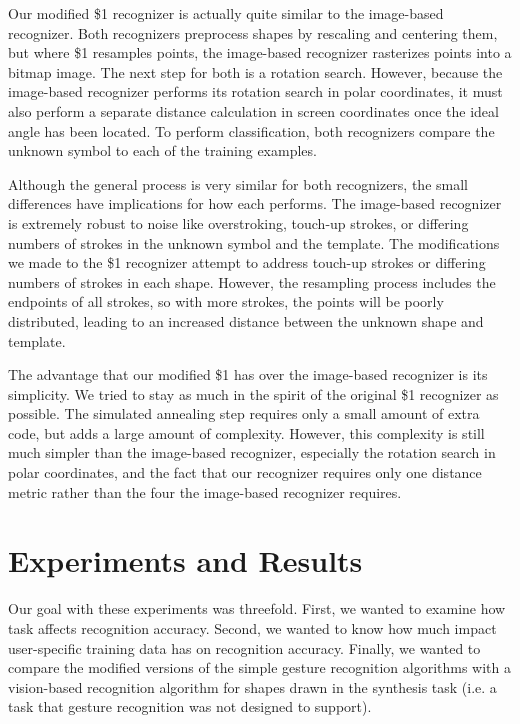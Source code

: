 \documentclass{egpubl}
\begin{document}
Our modified \$1 recognizer is actually quite similar to the image-based recognizer. Both recognizers preprocess shapes by rescaling and centering them, but where \$1 resamples points, the image-based recognizer rasterizes points into a bitmap image. The next step for both is a rotation search. However, because the image-based recognizer performs its rotation search in polar coordinates, it must also perform a separate distance calculation in screen coordinates once the ideal angle has been located. To perform classification, both recognizers compare the unknown symbol to each of the training examples.

Although the general process is very similar for both recognizers, the small differences have implications for how each performs. The image-based recognizer is extremely robust to noise like overstroking, touch-up strokes, or differing numbers of strokes in the unknown symbol and the template. The modifications we made to the \$1 recognizer attempt to address touch-up strokes or differing numbers of strokes in each shape. However, the resampling process includes the endpoints of all strokes, so with more strokes, the points will be poorly distributed, leading to an increased distance between the unknown shape and template.

The advantage that our modified \$1 has over the image-based recognizer is its simplicity. We tried to stay as much in the spirit of the original \$1 recognizer as possible. The simulated annealing step requires only a small amount of extra code, but adds a large amount of complexity. However, this complexity is still much simpler than the image-based recognizer, especially the rotation search in polar coordinates, and the fact that our recognizer requires only one distance metric rather than the four the image-based recognizer requires.

\section{Experiments and Results}
Our goal with these experiments was threefold.  First, we wanted to examine how task affects recognition accuracy.  Second, we wanted to know how much impact user-specific training data has on recognition accuracy.  Finally, we wanted to compare the modified versions of the simple gesture recognition algorithms with a vision-based recognition algorithm for shapes drawn in the synthesis task (i.e. a task that gesture recognition was not designed to support).
\end{document}
